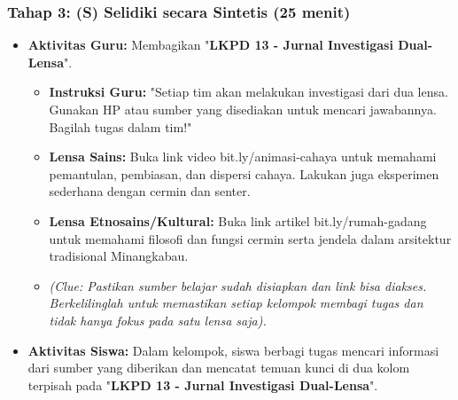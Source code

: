 \documentclass[12pt,a4paper]{article}
\begin{document}
\subsubsection{Tahap 3: (S) Selidiki secara Sintetis (25 menit)}
\begin{itemize}
\item \textbf{Aktivitas Guru:} Membagikan "\textbf{LKPD 13 - Jurnal Investigasi Dual-Lensa}".
    \begin{itemize}
    \item \textbf{Instruksi Guru:} "Setiap tim akan melakukan investigasi dari dua lensa. Gunakan HP atau sumber yang disediakan untuk mencari jawabannya. Bagilah tugas dalam tim!"
    \item \textbf{Lensa Sains:} Buka link video bit.ly/animasi-cahaya untuk memahami pemantulan, pembiasan, dan dispersi cahaya. Lakukan juga eksperimen sederhana dengan cermin dan senter.
    \item \textbf{Lensa Etnosains/Kultural:} Buka link artikel bit.ly/rumah-gadang untuk memahami filosofi dan fungsi cermin serta jendela dalam arsitektur tradisional Minangkabau.
    \item \textit{(Clue: Pastikan sumber belajar sudah disiapkan dan link bisa diakses. Berkelilinglah untuk memastikan setiap kelompok membagi tugas dan tidak hanya fokus pada satu lensa saja).}
    \end{itemize}
\item \textbf{Aktivitas Siswa:} Dalam kelompok, siswa berbagi tugas mencari informasi dari sumber yang diberikan dan mencatat temuan kunci di dua kolom terpisah pada "\textbf{LKPD 13 - Jurnal Investigasi Dual-Lensa}".
\end{itemize}
\end{document}
